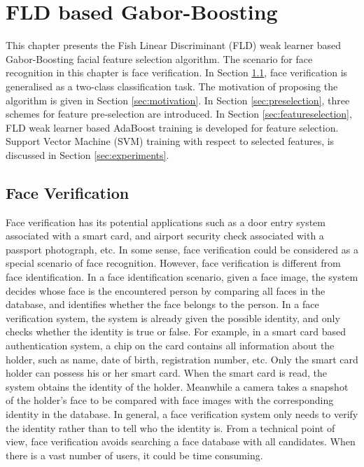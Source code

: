 \chapter{FLD based Gabor-Boosting}
\label{ch:FLDAdaBoost}
This chapter presents the Fish Linear Discriminant (FLD) weak learner based Gabor-Boosting facial feature selection algorithm. The scenario for face recognition in this chapter is face verification. In \mbox{Section} \ref{sec:faceverification}, face verification is generalised as a two-class classification task. The motivation of proposing the algorithm is given in \mbox{Section} \ref{sec:motivation}. In \mbox{Section} \ref{sec:preselection}, three schemes for feature pre-selection are introduced. In \mbox{Section} \ref{sec:featureselection}, FLD weak learner based AdaBoost training is developed for feature selection. Support Vector Machine (SVM) training with respect to selected features, is discussed in \mbox{Section} \ref{sec:experiments}. 

\section{Face Verification}
\label{sec:faceverification}
Face verification has its potential applications such as a door entry system associated with a smart card, and airport security check associated with a passport photograph, etc. In some sense, face verification could be considered as a special scenario of face recognition. However, face verification is different from face identification. In a face identification scenario, given a face image, the system decides whose face is the encountered person by comparing all faces in the database, and identifies whether the face belongs to the person. In a face verification system, the system is already given the possible identity, and only checks whether the identity is true or false. For example, in a smart card based authentication system, a chip on the card contains all information about the holder, such as name, date of birth, registration number, etc. Only the smart card holder can possess his or her smart card. When the smart card is read, the system obtains the identity of the holder. Meanwhile a camera takes a snapshot of the holder's face to be compared with face images with the corresponding identity in the database. In general, a face verification system only needs to verify the identity rather than to tell who the identity is. From a technical point of view, face verification avoids searching a face database with all candidates. When there is a vast number of users, it could be time consuming.

